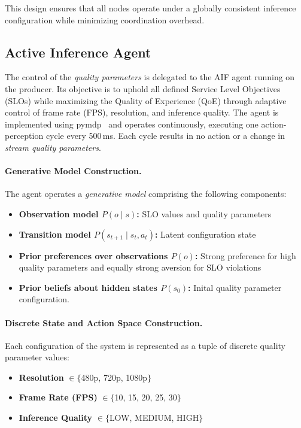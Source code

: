 This design ensures that all nodes operate under a globally consistent inference configuration while minimizing coordination overhead.

\subsection{Active Inference Agent}
\label{sec:evaluation-implementation-active-infernce-agemt}
The control of the \textit{quality parameters} is delegated to the AIF agent running on the producer. Its objective is to uphold all defined Service Level Objectives (SLOs) while maximizing the Quality of Experience (QoE) through adaptive control of frame rate (FPS), resolution, and inference quality. The agent is implemented using pymdp~\cite{heins_pymdp_2022} and operates continuously, executing one action-perception cycle every 500\,ms. Each cycle results in no action or a change in \textit{stream quality parameters}. 

\paragraph{Generative Model Construction.}
The agent operates a \textit{generative model} comprising the following components:
\begin{itemize}
  \item \textbf{Observation model \(P(o \mid s)\):} SLO values and quality parameters
  \item \textbf{Transition model \(P(s_{t+1} \mid s_t,a_t)\):} Latent configuration state
  \item \textbf{Prior preferences over observations \(P(o)\):} Strong preference for high quality parameters and equally strong aversion for SLO violations
  \item \textbf{Prior beliefs about hidden states \(P(s_0)\):} Inital quality parameter configuration.
\end{itemize}

\paragraph{Discrete State and Action Space Construction.}
Each configuration of the system is represented as a tuple of discrete quality parameter values:
\begin{itemize}
  \item \textbf{Resolution} $\in \{$480p, 720p, 1080p$\}$
  \item \textbf{Frame Rate (FPS)} $\in \{$10, 15, 20, 25, 30$\}$
  \item \textbf{Inference Quality} $\in \{$LOW, MEDIUM, HIGH$\}$
\end{itemize}

